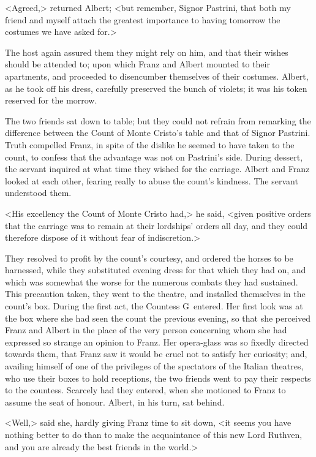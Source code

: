  <Agreed,> returned Albert; <but remember, Signor Pastrini, that both my friend and myself attach the greatest importance to having tomorrow the costumes we have asked for.> 

 The host again assured them they might rely on him, and that their wishes should be attended to; upon which Franz and Albert mounted to their apartments, and proceeded to disencumber themselves of their costumes. Albert, as he took off his dress, carefully preserved the bunch of violets; it was his token reserved for the morrow. 

 The two friends sat down to table; but they could not refrain from remarking the difference between the Count of Monte Cristo's table and that of Signor Pastrini. Truth compelled Franz, in spite of the dislike he seemed to have taken to the count, to confess that the advantage was not on Pastrini's side. During dessert, the servant inquired at what time they wished for the carriage. Albert and Franz looked at each other, fearing really to abuse the count's kindness. The servant understood them. 

 <His excellency the Count of Monte Cristo had,> he said, <given positive orders that the carriage was to remain at their lordships' orders all day, and they could therefore dispose of it without fear of indiscretion.> 

 They resolved to profit by the count's courtesy, and ordered the horses to be harnessed, while they substituted evening dress for that which they had on, and which was somewhat the worse for the numerous combats they had sustained.  This precaution taken, they went to the theatre, and installed themselves in the count's box. During the first act, the Countess G\doubleemdash~entered. Her first look was at the box where she had seen the count the previous evening, so that she perceived Franz and Albert in the place of the very person concerning whom she had expressed so strange an opinion to Franz. Her opera-glass was so fixedly directed towards them, that Franz saw it would be cruel not to satisfy her curiosity; and, availing himself of one of the privileges of the spectators of the Italian theatres, who use their boxes to hold receptions, the two friends went to pay their respects to the countess. Scarcely had they entered, when she motioned to Franz to assume the seat of honour. Albert, in his turn, sat behind. 

 <Well,> said she, hardly giving Franz time to sit down, <it seems you have nothing better to do than to make the acquaintance of this new Lord Ruthven, and you are already the best friends in the world.> 

